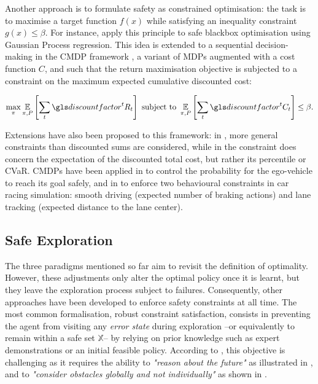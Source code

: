 Another approach is to formulate safety as constrained optimisation: the task is to maximise a target function $f(x)$ while satisfying an inequality constraint $g(x)\leq \beta$. For instance, \citet{Berkenkamp2016} apply this principle to safe blackbox optimisation using Gaussian Process regression. This idea is extended to a sequential decision-making in the \gls{CMDP} framework \citep{Altman1999,Achiam2017}, a variant of \glspl{MDP} augmented with a cost function $C$, and such that the return maximisation objective is subjected to a constraint on the maximum expected cumulative discounted cost:

\begin{equation*}
\max_\pi \expectedvalue_{\pi, P} \left[\sum_t \discount^t R_t \right] \text{ subject to } \expectedvalue_{\pi, P} \left[\sum_t \discount^t C_t \right] \leq \beta.
\end{equation*}

Extensions have also been proposed to this framework: in \citep{Tessler2019}, more general constraints than discounted sums are considered, while in \citep{Geibel2005,Chow2018} the constraint does concern the expectation of the discounted total cost, but rather its percentile or \gls{CVaR}. 
\glspl{CMDP} have been applied in \citep{Bouton2019workshop,Bouton2019} to control the probability for the ego-vehicle to reach its goal safely, and in \citep{Le2019} to enforce two behavioural constraints in car racing simulation: smooth driving (expected number of braking actions) and lane tracking (expected distance to the lane center).

\subsection{Safe Exploration}

The three paradigms mentioned so far aim to revisit the definition of optimality. However, these adjustments only alter the optimal policy once it is learnt, but they leave the exploration process subject to failures. Consequently, other approaches have been developed to enforce safety constraints at all time. The most common formalisation, robust constraint satisfaction, consists in preventing the agent from visiting any \emph{error state} during exploration --or equivalently to remain within a safe set $\mathbb{X}$-- by relying on prior knowledge such as expert demonstrations or an initial feasible policy.
According to \citet{Fraichard2014}, this objective is challenging as it requires the ability to \textit{"reason about the future"} as illustrated in , and to \textit{"consider obstacles globally and not individually"} as shown in .

